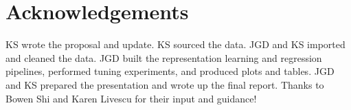 \documentclass[a4paper]{article}
\begin{document}
    \section{Acknowledgements}
    KS wrote the proposal and update. KS sourced the data. JGD and KS imported and cleaned the data. JGD built the representation learning and regression pipelines, performed tuning experiments, and produced plots and tables. JGD and KS prepared the presentation and wrote up the final report. Thanks to Bowen Shi and Karen Livescu for their input and guidance!   


  \newpage
  \eightpt
  

  

\end{document}
